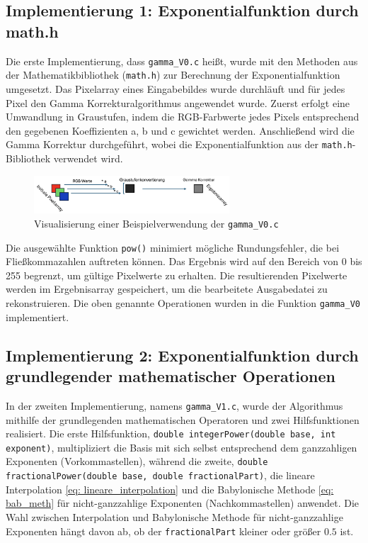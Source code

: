 \documentclass[course=erap]{aspdoc}
\begin{document}
\subsection{Implementierung 1: Exponentialfunktion durch math.h}
Die erste Implementierung, dass \texttt{gamma\_V0.c} heißt, wurde mit den Methoden aus der Mathematikbibliothek (\texttt{math.h}) zur Berechnung der Exponentialfunktion umgesetzt. Das Pixelarray eines Eingabebildes wurde durchläuft und für jedes Pixel den Gamma Korrekturalgorithmus angewendet wurde. Zuerst erfolgt eine Umwandlung in Graustufen, indem die RGB-Farbwerte jedes Pixels entsprechend den gegebenen Koeffizienten a, b und c gewichtet werden. Anschließend wird die Gamma Korrektur durchgeführt, wobei die Exponentialfunktion aus der \texttt{math.h}-Bibliothek verwendet wird. 

\begin{figure}[h]
\centering
\includegraphics[width =0.65\textwidth]{images/gamma_v0.png}
\caption{Visualisierung einer Beispielverwendung der \texttt{gamma\_V0.c}}
\label{fig:3}
\end{figure}

Die ausgewählte Funktion \texttt{pow()} minimiert mögliche Rundungsfehler, die bei Fließkommazahlen auftreten können. Das Ergebnis wird auf den Bereich von 0 bis 255 begrenzt, um gültige Pixelwerte zu erhalten. Die resultierenden Pixelwerte werden im Ergebnisarray gespeichert, um die bearbeitete Ausgabedatei zu rekonstruieren. Die oben genannte Operationen wurden in die Funktion \texttt{gamma\_V0} implementiert. 



\subsection{Implementierung 2: Exponentialfunktion durch grundlegender mathematischer Operationen}
In der zweiten Implementierung, namens \texttt{gamma\_V1.c}, wurde der Algorithmus mithilfe der grundlegenden mathematischen Operatoren und zwei Hilfsfunktionen realisiert. 
Die erste Hilfsfunktion, \texttt{double integerPower(double base, int exponent)},
multipliziert die Basis mit sich selbst entsprechend dem ganzzahligen Exponenten (Vorkommastellen), während die zweite, \texttt{double fractionalPower(double base, double fractionalPart)}, die lineare Interpolation \eqref{eq: lineare_interpolation} und die Babylonische Methode \eqref{eq: bab_meth} für nicht-ganzzahlige Exponenten (Nachkommastellen) anwendet. Die Wahl zwischen Interpolation und Babylonische Methode für nicht-ganzzahlige Exponenten hängt davon ab, ob der \texttt{fractionalPart} kleiner oder größer $0.5$ ist. \par
\end{document}
